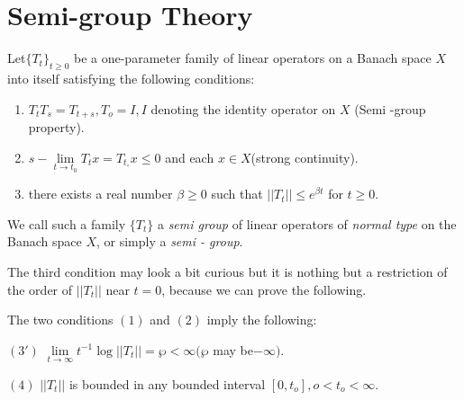 \part{Semi-group Theory}\label{chap4:p2} 

\begin{defi*}
 Let\pageoriginale $\{T_t\}_{ t \geq 0}$ be a one-parameter family of linear
 operators on a Banach space $X$ into itself satisfying the following
 conditions: 
 \begin{enumerate}[\rm (1)]
 \item $T_t T_s = T_{ t +s}, T_o = I, I$ denoting the identity
  operator on $X$ (Semi -group property). 
 \item $s - \lim\limits_{ t \to t_0 } T_ t x = T_{t_\circ}x\leq 0$ and
  each $x \in X$(strong continuity). 
 \item there exists a real number $\beta \geq 0$ such that $|| T_t ||
  \leq e^{ \beta t}$ for $t \geq 0$. 
 \end{enumerate}
 
 We call such a family $\{T_t\}$ a {\em semi group} of linear
 operators of {\em normal type} on the Banach space $X$, or simply a
 {\em semi - group}. 
\end{defi*}

\begin{remark*}
 The third condition may look a bit curious but it is nothing but a
 restriction of the order of $|| T_t||$ near $ t = 0$, because we can
 prove the following. 
\end{remark*}

\begin{prop*}
 The two conditions $(1)$ and $(2)$ imply the following: 

 $(3')$ $\lim\limits_{ t \to \infty} t^{-1} \log || T_t || = \wp <
 \infty (\wp$ may be$-\infty )$. 

 $(4)$ $||T_t||$ is bounded in any bounded interval $[0, t_o], o <
 t_o < \infty$. 
\end{prop*}

